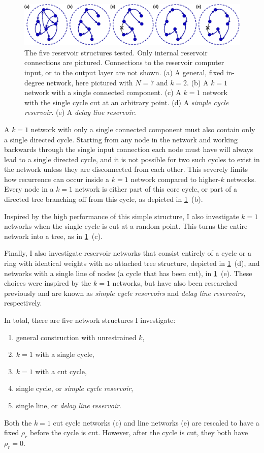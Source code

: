 \begin{figure}
  \includegraphics[width=\textwidth]{figures/topology}
  \caption{The five reservoir structures tested. Only internal
    reservoir connections are pictured. Connections to the reservoir
    computer input, or to the output layer are not shown. (a) A
    general, fixed in-degree network, here pictured with $N=7$ and
    $k=2$. (b) A $k=1$ network with a single connected component. (c)
    A $k=1$ network with the single cycle cut at an arbitrary
    point. (d) A \emph{simple cycle reservoir}. (e) A \emph{delay line
      reservoir}.}%
  \label{fig:topology}
\end{figure}

A $k = 1$ network with only a single connected component must also
contain only a single directed cycle. Starting from any node in the
network and working backwards through the single input connection each
node must have will always lead to a single directed cycle, and it is
not possible for two such cycles to exist in the network unless they
are disconnected from each other. This severely limits how recurrence
can occur inside a $k = 1$ network compared to higher-$k$
networks. Every node in a $k = 1$ network is either part of this core
cycle, or part of a directed tree branching off from this cycle, as
depicted in \cref{fig:topology}~(b).

Inspired by the high performance of this simple structure, I also
investigate $k = 1$ networks when the single cycle is cut at a random
point. This turns the entire network into a tree, as in
\cref{fig:topology}~(c).

Finally, I also investigate reservoir networks that consist entirely
of a cycle or a ring with identical weights with no attached tree
structure, depicted in \cref{fig:topology}~(d), and networks with a
single line of nodes (a cycle that has been cut), in
\cref{fig:topology}~(e). These choices were inspired by the $k = 1$
networks, but have also been researched previously and are known as
\emph{simple cycle reservoirs} and \emph{delay line reservoirs},
respectively.\cite{rodan2011}

In total, there are five network structures I investigate:
\begin{enumerate}[label= (\alph*)]
\item general construction with unrestrained $k$,
\item $k = 1$ with a single cycle,
\item $k = 1$ with a cut cycle,
\item single cycle, or \emph{simple cycle reservoir},
\item single line, or \emph{delay line reservoir}.
\end{enumerate}
Both the $k = 1$ cut cycle networks (c) and line networks (e) are
rescaled to have a fixed $\rho_r$ before the cycle is
cut. However, after the cycle is cut, they both have $\rho_r=0$.

